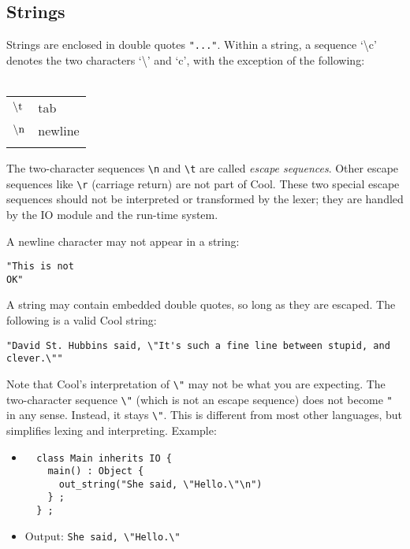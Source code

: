 \documentclass[]{article}
\begin{document}
\subsection{Strings}

Strings are enclosed in double quotes \texttt{"..."}. Within a string, a
sequence `\textbackslash{}c' denotes the two characters
`\textbackslash{}' and `c', with the exception of the following: \\ \\

\begin{longtable}[c]{@{}ll@{}}
\hline\noalign{\medskip}
$\rm\backslash t$ & tab
\\\noalign{\medskip}
$\rm\backslash n$ & newline
\\\noalign{\medskip}
\hline
\end{longtable}

The two-character sequences \texttt{\textbackslash{}n} and
\texttt{\textbackslash{}t} are called \emph{escape sequences}. Other
escape sequences like \texttt{\textbackslash{}r} (carriage return) are
not part of Cool. These two special escape sequences should not be
interpreted or transformed by the lexer; they are handled by the IO
module and the run-time system.

A newline character may not appear in a string:

\begin{verbatim}
"This is not
OK"
\end{verbatim}

A string may contain embedded double quotes, so long as they are
escaped. The following is a valid Cool string:

\begin{verbatim}
"David St. Hubbins said, \"It's such a fine line between stupid, and clever.\""
\end{verbatim}

Note that Cool's interpretation of \texttt{\textbackslash{}"} may not be
what you are expecting. The two-character sequence
\texttt{\textbackslash{}"} (which is not an escape sequence) does not
become \texttt{"} in any sense. Instead, it stays
\texttt{\textbackslash{}"}. This is different from most other languages,
but simplifies lexing and interpreting. Example:

\begin{itemize}
\item
\begin{verbatim}
  class Main inherits IO {
    main() : Object { 
      out_string("She said, \"Hello.\"\n") 
    } ;
  } ; 
\end{verbatim}
\item
  Output: \texttt{She said, \textbackslash{}"Hello.\textbackslash{}"}
\end{itemize}
\end{document}
